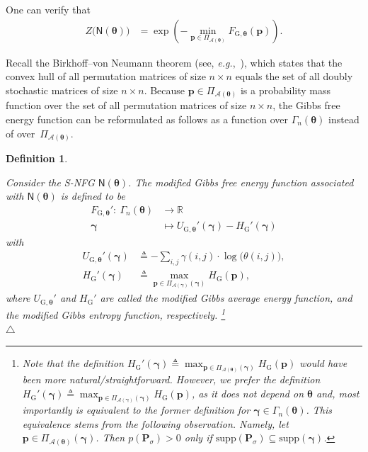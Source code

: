 \documentclass[journal,lettersize,twocolumn]{IEEEtran} %
\newtheorem{definition}[theorem]{Definition}
\newcommand{\edefinition}{\hfill$\triangle$}
\newcommand{\vect}[1]{ \bm{#1} }
\newcommand{\set}[1]{\mathcal{#1}}
\newcommand{\vgam}{ \vect{\gamma} }
\newcommand{\sfN}{ \mathsf{N} }
\newcommand{\sR}{\mathbb{R}}
\newcommand{\matr}[1]{ \bm{#1} }
\newcommand{\defeq}{ \triangleq }
\newcommand{\supp}{\mathrm{supp}}
\newcommand{\mtheta}{\matr{\theta}}
\newcommand{\mP}{\matr{P}}
\newcommand{\setA}{ \set{A} }
\newcommand{\HG}{H_{ \mathrm{G} }}
\newcommand{\FGthe}{F_{ \mathrm{G}, \mtheta }}
\newcommand{\UGthe}{U_{ \mathrm{G}, \mtheta }}
\newcommand{\vp}{\bm{p} }
\newcommand{\PiA}[1]{ \Pi_{\setA(#1)} }
\newcommand{\eg}{\textit{e.g.}}
\begin{document}
%

One can verify that
\begin{align*}
  Z\bigl( \sfN(\mtheta) \bigr) 
    &= \exp
         \left( 
           - \min_{\vp \in \PiA{\mtheta}} \FGthe(\vp)
         \right).
\end{align*}

%

Recall the Birkhoff--von Neumann theorem (see, \eg,~\cite[Theorem
4.3.49]{Horn2012}), which states that the convex hull of all permutation
matrices of size $n \times n$ equals the set of all doubly stochastic matrices
of size $ n \times n $. Because $\vp \in \PiA{\mtheta}$ is a probability mass
function over the set of all permutation matrices of size $n \times n$, the
Gibbs free energy function can be reformulated as follows as a function over
$\Gamma_{n}(\mtheta)$ instead of over~$\PiA{\mtheta}$.

%
%
%
%
%
%
%
%
%
%
%
%
%
%
%

%

\begin{definition}
  \label{sec:1:def:18:part:2}

  Consider the S-NFG $ \sfN(\mtheta) $. The modified Gibbs free energy
  function associated with $ \sfN(\mtheta) $ is defined to be
  \begin{align*}
    \FGthe': \ \Gamma_{n}(\mtheta) &\to \sR \\
               \vgam               &\mapsto \UGthe'(\vgam) - \HG'(\vgam)
  \end{align*}
  with
  \begin{align*}
    \UGthe'(\vgam)
      &\defeq 
         - 
         \sum_{ i,j }  
           \gamma(i,j) \cdot \log\bigl( \theta(i,j) \bigr), \\ 
    \HG'(\vgam)
      &\defeq
         \max_{ \vp \in \PiA{\vgam}( \vgam ) }
           \HG(\vp),
  \end{align*}
  where $ \UGthe' $ and $ \HG' $ are called the modified Gibbs average energy
  function, and the modified Gibbs entropy function, respectively.%
  \footnote{\label{footnote:PiA:support:condition:1}%
    Note that the definition
    $\HG'(\vgam) \defeq \max_{ \vp \in \PiA{\mtheta}( \vgam ) } \HG(\vp)$
    would have been more natural/straightforward. However, we prefer the
    definition
    $\HG'(\vgam) \defeq \max_{ \vp \in \PiA{\vgam}( \vgam ) } \HG(\vp)$, as it
    does not depend on $\mtheta$ and, most importantly is equivalent to the
    former definition for $\vgam \in \Gamma_{n}(\mtheta)$. This equivalence
    stems from the following observation. Namely, let
    $\vp \in \PiA{\mtheta}( \vgam )$. Then $p(\mP_{\sigma}) > 0$ only if
    $\supp(\mP_{\sigma}) \subseteq \supp(\vgam)$.} \\
  \mbox{} \edefinition
\end{definition}
\end{document}
